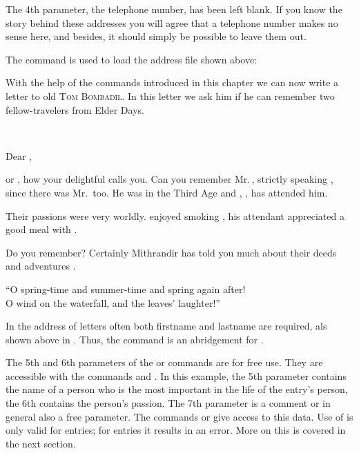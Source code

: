 The 4th parameter, the telephone number, has been
left blank. If you know the story behind these addresses you will
agree that a telephone number makes no sense here, and besides, it
should simply be possible to leave them out. 

The command
 is used to load the address file shown above:
\begin{lstcode}[belowskip=\dp\strutbox]
\end{lstcode}


With the help of the commands introduced in this chapter we can now
write a letter to old \textsc{Tom Bombadil}.  In this letter we ask
him if he can remember two fellow-travelers from Elder Days.
\begin{lstcode}[belowskip=\dp\strutbox]
  \begin{letter}{\\}
     \opening{Dear  ,}
     
     or , how your delightful  calls you.  Can
     you remember Mr.\,, strictly speaking
     , since there was Mr.\, too.  He was
      in the Third Age and  ,
     , has attended him.
      
      Their passions were very worldly.   enjoyed
      smoking , his attendant appreciated a good meal with
      .

      Do you remember? Certainly Mithrandir has told you much
      about their deeds and adventures .
    \closing{``O spring-time and summer-time
                and spring again after!\\
               O wind on the waterfall,
                and the leaves' laughter!''}
  \end{letter}
\end{lstcode}
In the address of letters often both firstname and lastname are required, als
shown above in .  Thus, the command
 is an abridgement for
 .

The 5th and 6th parameters of the  or 
commands are for free use.  They are accessible with the commands
 and .  In this example, the 5th parameter contains
the name of a person who is the most important in the life of the entry's
person, the 6th contains the person's passion.  The 7th parameter is a comment
or in general also a free parameter. The commands  or
 give access to this data. Use of  is only valid
for  entries; for  entries it results in an
error. More on this is covered in the next section.

